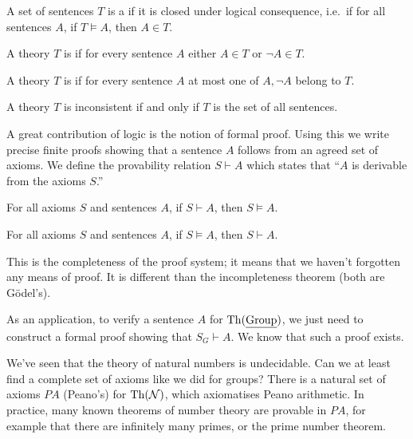 \begin{definition}
  A set of sentences $T$ is a  if it is closed under logical
  consequence, i.e.~if for all sentences $A$, if $T \models A$, then $A \in T$.
\end{definition}

\begin{definition}
  A theory $T$ is  if for every sentence $A$ either $A \in T$ or
  $\lnot A \in T$.
\end{definition}

\begin{definition}
  A theory $T$ is  if for every sentence $A$ at most one of
  $A, \lnot A$ belong to $T$.
\end{definition}

\begin{remark}
  A theory $T$ is inconsistent if and only if $T$ is the set of all sentences.
\end{remark}

A great contribution of logic is the notion of formal proof.
Using this we write precise finite proofs showing that a sentence $A$ follows
from an agreed set of axioms.
We define the provability relation $S \vdash A$ which states that \enquote{$A$
  is derivable from the axioms $S$.}

\begin{theorem}
  For all axioms $S$ and sentences $A$, if $S \vdash A$, then $S \models A$.
\end{theorem}

\begin{theorem}
  For all axioms $S$ and sentences $A$, if $S \models A$, then $S \vdash A$.
\end{theorem}

\begin{remark}
  This is the completeness of the proof system; it means that we haven't
  forgotten any means of proof.
  It is different than the incompleteness theorem (both are Gödel's).
\end{remark}

\begin{remark}
  As an application, to verify a sentence $A$ for $\operatorname{Th}(\underline{\text{Group}})$, we just
  need to construct a formal proof showing that $S_G \vdash A$.
  We know that such a proof exists.
\end{remark}

We've seen that the theory of natural numbers is undecidable.
Can we at least find a complete set of axioms like we did for groups?
There is a natural set of axioms $\mathit{PA}$ (Peano's) for $\operatorname{Th}(\mathcal{N})$,
which axiomatises Peano arithmetic.
In practice, many known theorems of number theory are provable in $\mathit{PA}$,
for example that there are infinitely many primes, or the prime number theorem.

